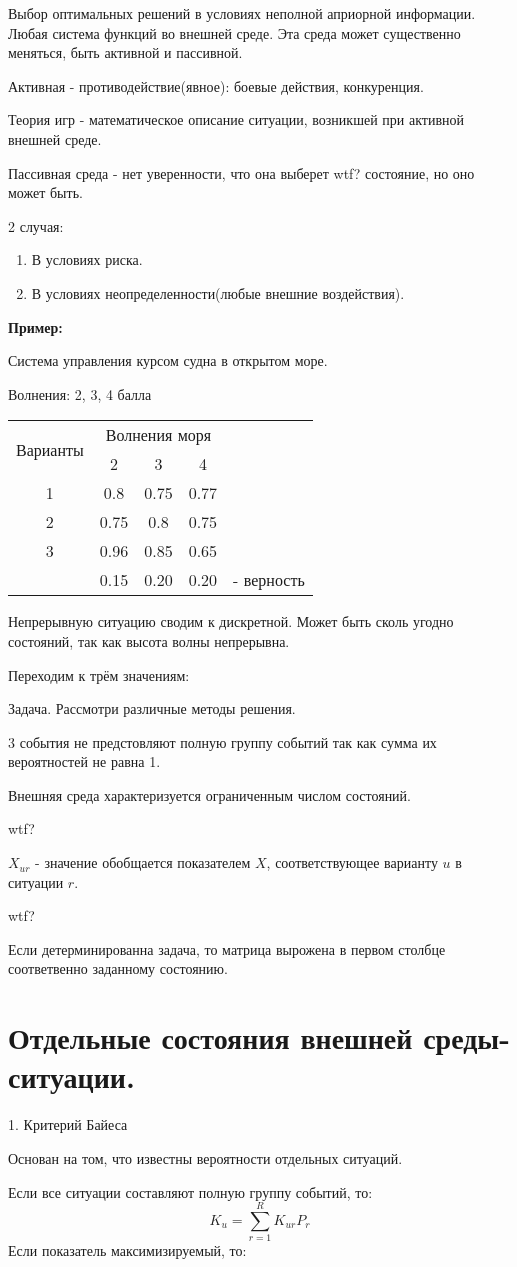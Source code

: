 \documentclass[12pt,a5paper]{scrbook}
\begin{document}
  Выбор оптимальных решений в условиях неполной априорной информации. Любая система функций во внешней среде. Эта среда может существенно меняться, быть активной и пассивной.

  Активная - противодействие(явное): боевые действия, конкуренция.

  Теория игр - математическое описание ситуации, возникшей при активной внешней среде.

  Пассивная среда - нет уверенности, что она выберет wtf? состояние, но оно может быть.

  2 случая:
  \begin{enumerate}
    \item В условиях риска.
    \item В условиях неопределенности(любые внешние воздействия).
  \end{enumerate}

  \textbf{Пример:}

  Система управления курсом судна в открытом море.

  Волнения: 2, 3, 4 балла

  \begin{tabular}{c|c|c|cl}
    \cline{1-4}
    \multirow{2}{*}{Варианты} & \multicolumn{3}{c}{Волнения моря}&\\
    \cline{2-4}
    & 2 & 3 & 4&\\
    \cline{1-4}
    1 & 0.8 & 0.75 & 0.77&\\
    \cline{1-4}
    2 & 0.75 & 0.8 & 0.75&\\
    \cline{1-4}
    3 & 0.96 & 0.85 & 0.65&\\
    \cline{1-4}
    & 0.15 & 0.20 & 0.20 & - верность
  \end{tabular}

  Непрерывную ситуацию сводим к дискретной. Может быть сколь угодно состояний, так как высота волны непрерывна.

  Переходим к трём значениям:

  Задача. Рассмотри различные методы решения.

  3 события не предстовляют полную группу событий так как сумма их вероятностей не равна 1.

  Внешняя среда характеризуется ограниченным числом состояний.

  wtf?

  $X_{ur}$ - значение обобщается показателем $X$, соответствующее варианту $u$ в ситуации $r$.

  wtf?

  Если детерминированна задача, то матрица вырожена в первом столбце соответвенно заданному состоянию.

  \section{Отдельные состояния внешней среды-ситуации.}

  1. Критерий Байеса

  Основан на том, что известны вероятности отдельных ситуаций.

  Если все ситуации составляют полную группу событий, то:
  $$K_u = \sum_{r=1}^RK_{ur}P_r$$
  Если показатель максимизируемый, то:

\end{document}
